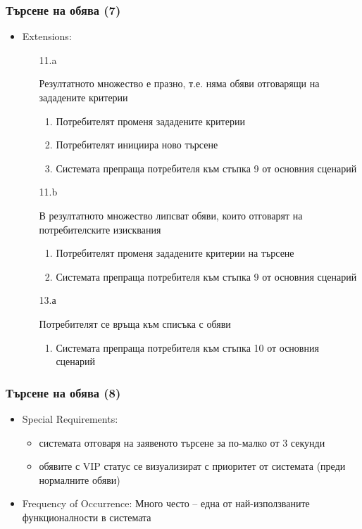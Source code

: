 \documentclass[12pt]{beamer}
\begin{document}
\begin{frame}[fragile]
\frametitle{Търсене на обява (7)}
\begin{itemize}
	\item {Extensions:
		\begin{itemize}
        \item[11.a] {Резултатното множество е празно, т.е. няма обяви отговарящи на зададените критерии
                \begin{enumerate}[1.]
                \item Потребителят променя зададените критерии
                \item Потребителят инициира ново търсене
                \item Системата препраща потребителя към стъпка 9 от основния сценарий
                \end{enumerate}
        }
        \item[11.b] {В резултатното множество липсват обяви, които отговарят на потребителските изисквания
                \begin{enumerate}[1.]
                \item Потребителят променя зададените критерии на търсене
                \item Системата препраща потребителя към стъпка 9 от основния сценарий
                \end{enumerate}
		}
        \item[13.а] {Потребителят се връща към списъка с обяви
                \begin{enumerate}[1.]
                \item Системата препраща потребителя към стъпка 10 от основния сценарий
                \end{enumerate}        
        }
		\end{itemize}
	} 
\end{itemize}
\end{frame}

\begin{frame}[fragile]
\frametitle{Търсене на обява (8)}
\begin{itemize}
	\item {Special Requirements:
		\begin{itemize}
	        \item системата отговаря на заявеното търсене за по-малко от 3 секунди
	        \item обявите с VIP статус се визуализират с приоритет от системата (преди нормалните обяви)
   		\end{itemize}
   	}
	\item Frequency of Occurrence: Много често -- една от най-използваните функционалности в системата
\end{itemize}
\end{frame}
\end{document}

